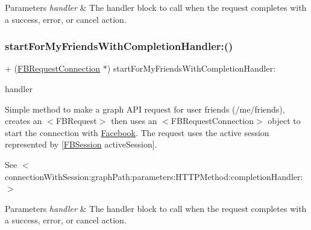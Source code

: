 \begin{DoxyParams}{Parameters}
{\em handler} & The handler block to call when the request completes with a success, error, or cancel action. \\
\hline
\end{DoxyParams}
\mbox{\label{interfaceFBRequestConnection_a1eeb9942474312db3197be0fa569bc60}} 
\subsubsection{\texorpdfstring{start\+For\+My\+Friends\+With\+Completion\+Handler\+:()}{startForMyFriendsWithCompletionHandler:()}\hspace{0.1cm}{\footnotesize\ttfamily [1/5]}}
{\footnotesize\ttfamily + (\hyperlink{interfaceFBRequestConnection}{F\+B\+Request\+Connection} $\ast$) start\+For\+My\+Friends\+With\+Completion\+Handler\+: \begin{DoxyParamCaption}\item[{(F\+B\+Request\+Handler)}]{handler }\end{DoxyParamCaption}}

Simple method to make a graph A\+PI request for user friends (/me/friends), creates an $<$\+F\+B\+Request$>$ then uses an $<$\+F\+B\+Request\+Connection$>$ object to start the connection with \hyperlink{interfaceFacebook}{Facebook}. The request uses the active session represented by {\ttfamily \mbox{[}\hyperlink{interfaceFBSession}{F\+B\+Session} active\+Session\mbox{]}}.

See $<$connection\+With\+Session\+:graph\+Path\+:parameters\+:\+H\+T\+T\+P\+Method\+:completion\+Handler\+:$>$


\begin{DoxyParams}{Parameters}
{\em handler} & The handler block to call when the request completes with a success, error, or cancel action. \\
\hline
\end{DoxyParams}
\mbox{\label{interfaceFBRequestConnection_a1eeb9942474312db3197be0fa569bc60}} 
